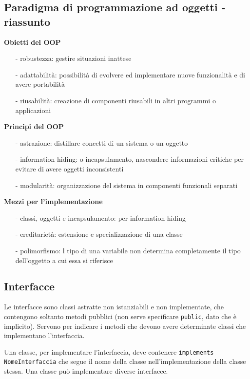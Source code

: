 \documentclass{article}
\begin{document}
\subsection*{Paradigma di programmazione ad oggetti - riassunto}
\textbf{Obietti del OOP}
\begin{itemize} [topsep=3pt, itemsep=0pt]
	\item[-] robustezza: gestire situazioni inattese
	\item[-] adattabilità: possibilità di evolvere ed implementare nuove funzionalità e di avere portabilità
	\item[-] riusabilità: creazione di componenti riusabili in altri programmi o applicazioni
\end{itemize}
\textbf{Principi del OOP}
\begin{itemize} [topsep=3pt, itemsep=0pt]
	\item[-] astrazione: distillare concetti di un sistema o un oggetto
	\item[-] information hiding: o incapsulamento, nascondere informazioni critiche per evitare di avere oggetti inconsistenti
	\item[-] modularità: organizzazione del sistema in componenti funzionali separati
\end{itemize}
\textbf{Mezzi per l'implementazione}
\begin{itemize} [topsep=3pt, itemsep=0pt]
	\item[-] classi, oggetti e incapsulamento: per information hiding
	\item[-] ereditarietà: estensione e specializzazione di una classe
	\item[-] polimorfismo: l tipo di una variabile non determina completamente il tipo dell'oggetto a cui essa si riferisce 
\end{itemize}

\newpage


\subsection{Interfacce}
Le interfacce sono classi astratte non istanziabili e non implementate, che contengono soltanto metodi pubblici (non serve
specificare \verb|public|, dato che è implicito). Servono per indicare i metodi che devono avere determinate classi che
implementano l'interfaccia.

Una classe, per implementare l'interfaccia, deve contenere \verb|implements NomeInterfaccia| che segue il nome della
classe nell'implementazione della classe stessa. Una classe può implementare diverse interfacce.
\end{document}
